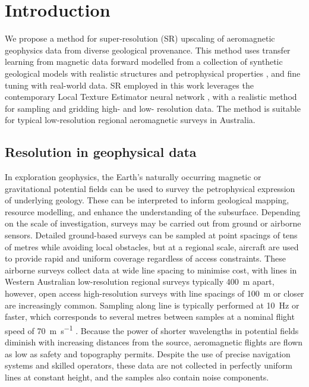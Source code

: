 \section{Introduction}
We propose a method for super-resolution (SR) upscaling of aeromagnetic geophysics data from diverse geological provenance.
This method uses transfer learning \parencite{tanSurveyDeepTransfer2018} from magnetic data forward modelled from a collection of synthetic geological models with realistic structures and petrophysical properties \parencite{jessellNoddyverseMassiveData2022}, and fine tuning with real-world data.
SR employed in this work leverages the contemporary Local Texture Estimator neural network \parencite{leeLocalTextureEstimator2022}, with a realistic method for sampling and gridding high- and low- resolution data.
The method is suitable for typical low-resolution regional aeromagnetic surveys in Australia.

\subsection{Resolution in geophysical data}
\label{sec:resinsurveys}
In exploration geophysics, the Earth's naturally occurring magnetic or gravitational potential fields can be used to survey the petrophysical expression of underlying geology.
These can be interpreted to inform geological mapping, resource modelling, and enhance the understanding of the subsurface.
Depending on the scale of investigation, surveys may be carried out from ground or airborne sensors.
Detailed ground-based surveys can be sampled at point spacings of tens of metres while avoiding local obstacles, but at a regional scale, aircraft are used to provide rapid and uniform coverage regardless of access constraints.
These airborne surveys collect data at wide line spacing to minimise cost, with lines in Western Australian low-resolution regional surveys typically \qty{400}{\m} apart, however, open access high-resolution surveys with line spacings of \qty{100}{\m} or closer are increasingly common.
Sampling along line is typically performed at \qty{10}{\Hz} or faster, which corresponds to several metres between samples at a nominal flight speed of \qty{70}{\m\per\s} \parencite{goodwinAirborneMagneticRadiometric2023}.
Because the power of shorter wavelengths in potential fields diminish with increasing distances from the source, aeromagnetic flights are flown as low as safety and topography permits.
Despite the use of precise navigation systems and skilled operators, these data are not collected in perfectly uniform lines at constant height, and the samples also contain noise components.

